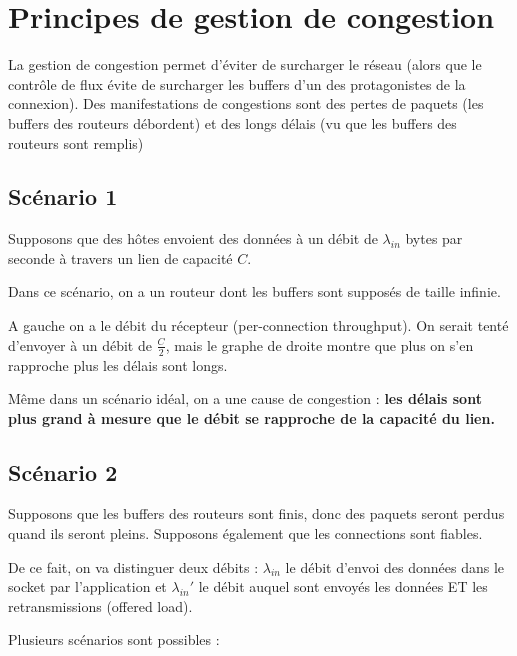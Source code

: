 \section{Principes de gestion de congestion}

La gestion de congestion permet d'éviter de surcharger le réseau (alors que le contrôle de flux évite de surcharger les buffers d'un des protagonistes de la connexion). Des manifestations de congestions sont des pertes de paquets (les buffers des routeurs débordent) et des longs délais (vu que les buffers des routeurs sont remplis)

	\subsection{Scénario 1}
	Supposons que des hôtes envoient des données à un débit de $\lambda_{in}$ bytes par seconde à travers un lien de capacité $C$.
	

	Dans ce scénario, on a un routeur dont les buffers sont supposés de taille infinie.
	
	A gauche on a le débit du récepteur (per-connection throughput). On serait tenté d'envoyer à un débit de $\frac{C}{2}$, mais le graphe de droite montre que plus on s'en rapproche plus les délais sont longs.
	
	
	Même
dans un scénario idéal, on a une cause de congestion : \textbf{les délais sont plus grand à mesure que le débit se rapproche de la capacité du lien.}
	
	\subsection{Scénario 2}
	
	Supposons que les buffers des routeurs sont finis, donc des paquets seront perdus quand ils seront pleins. Supposons également que les connections sont fiables.
	
	De ce fait, on va distinguer deux débits : $\lambda_{in}$ le débit d'envoi des données dans le socket par l'application et $\lambda_{in}'$ le débit auquel sont envoyés les données ET les retransmissions (offered load).
	
	
	Plusieurs scénarios sont possibles :
	
	
